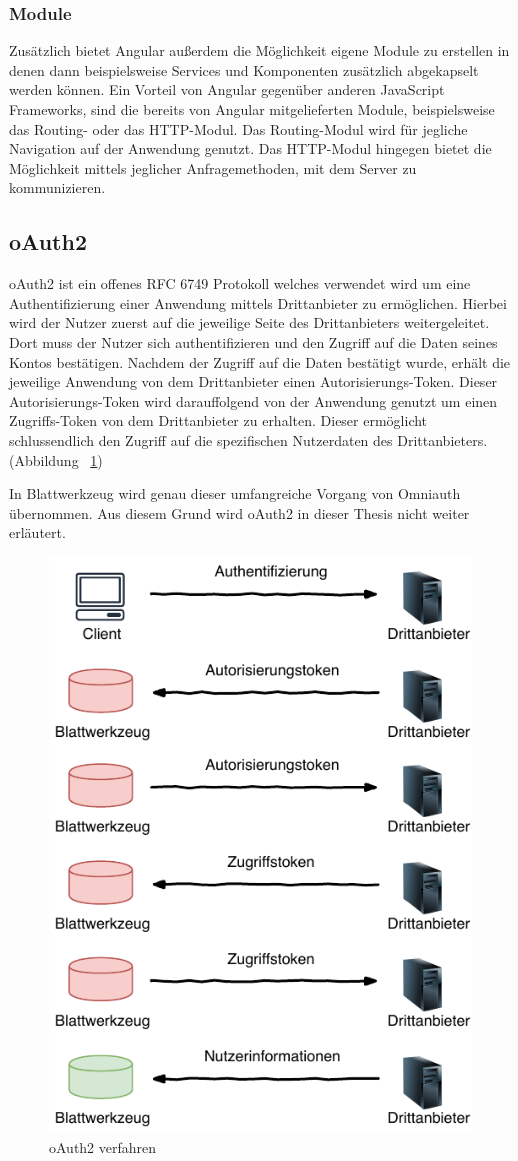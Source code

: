 \subsubsection{Module}
\label{sec: ang-modul}
Zusätzlich bietet Angular außerdem die Möglichkeit eigene Module zu erstellen in denen dann beispielsweise Services und Komponenten zusätzlich abgekapselt werden können. Ein Vorteil von Angular gegenüber anderen JavaScript Frameworks, sind die bereits von Angular mitgelieferten Module, beispielsweise das Routing- oder das HTTP-Modul. Das Routing-Modul wird für jegliche Navigation auf der Anwendung genutzt. Das \gls{HTTP}-Modul hingegen bietet die Möglichkeit mittels jeglicher Anfragemethoden, mit dem Server zu kommunizieren.

\subsection{oAuth2}
\label{sec: oauth2}
\gls{oAuth2} ist ein offenes \gls{RFC} 6749 Protokoll welches verwendet wird um eine Authentifizierung einer Anwendung mittels Drittanbieter zu ermöglichen. Hierbei wird der Nutzer zuerst auf die jeweilige Seite des Drittanbieters weitergeleitet. Dort muss der Nutzer sich authentifizieren und den Zugriff auf die Daten seines Kontos bestätigen. Nachdem der Zugriff auf die Daten bestätigt wurde, erhält die jeweilige Anwendung von dem Drittanbieter einen Autorisierungs-Token. Dieser Autorisierungs-Token wird darauffolgend von der Anwendung genutzt um einen Zugriffs-Token von dem Drittanbieter zu erhalten. Dieser ermöglicht schlussendlich den Zugriff auf die spezifischen Nutzerdaten des Drittanbieters. (Abbildung ~\ref{fig:oauth2})

In Blattwerkzeug wird genau dieser umfangreiche Vorgang von Omniauth übernommen. Aus diesem Grund wird oAuth2 in dieser Thesis nicht weiter erläutert.

\begin{figure}[h]
	\centering
	\includegraphics[width=.55\textwidth]{graphics/oauth2.pdf}
	\caption{oAuth2 verfahren}
	\label{fig:oauth2}
\end{figure}